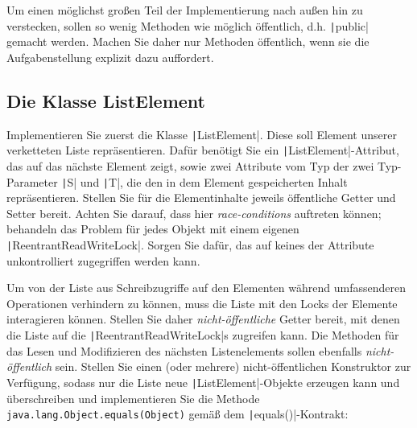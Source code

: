 \documentclass[11pt]{exam} %
\newcommand{\code}[1]{\texttt|#1|}
\begin{document}
Um einen möglichst großen Teil der Implementierung nach außen hin zu verstecken, sollen so wenig Methoden wie möglich öffentlich, d.h. \code{public} gemacht werden. Machen Sie daher nur Methoden öffentlich, wenn sie die Aufgabenstellung explizit dazu auffordert.

\subsection{Die Klasse ListElement}
Implementieren Sie zuerst die Klasse \code{ListElement}. Diese soll Element unserer verketteten Liste repräsentieren. Dafür benötigt Sie ein \code{ListElement}-Attribut, das auf das nächste Element zeigt, sowie zwei Attribute vom Typ der zwei Typ-Parameter \code{S} und \code{T}, die den in dem Element gespeicherten Inhalt repräsentieren. Stellen Sie für die Elementinhalte jeweils öffentliche Getter und Setter bereit. Achten Sie darauf, dass hier \emph{race-conditions} auftreten können; behandeln das Problem für jedes Objekt mit einem eigenen \code{ReentrantReadWriteLock}. Sorgen Sie dafür, das auf keines der Attribute unkontrolliert zugegriffen werden kann.\par
Um von der Liste aus Schreibzugriffe auf den Elementen während umfassenderen Operationen verhindern zu können, muss die Liste mit den Locks der Elemente interagieren können. Stellen Sie daher \emph{nicht-öffentliche} Getter bereit, mit denen die Liste auf die \code{ReentrantReadWriteLock}s zugreifen kann. Die Methoden für das Lesen und Modifizieren des nächsten Listenelements sollen ebenfalls \emph{nicht-öffentlich} sein.\newline
Stellen Sie einen (oder mehrere) nicht-öffentlichen Konstruktor zur Verfügung, sodass nur die Liste neue \code{ListElement}-Objekte erzeugen kann und überschreiben und implementieren Sie die Methode \texttt{java.lang.Object.equals(Object)} gemäß dem \code{equals()}-Kontrakt\cite[][S. 207]{Inden2015}:
\end{document}
